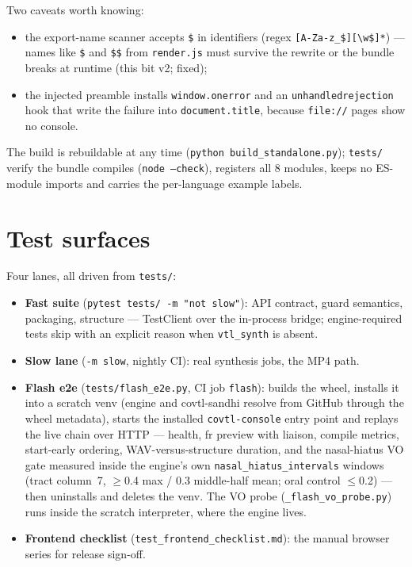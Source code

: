 \documentclass[11pt,a4paper]{article}
\begin{document}
Two caveats worth knowing:
\begin{itemize}
\item the export-name scanner accepts \texttt{\$} in identifiers
  (regex \texttt{[A-Za-z\_\$][\textbackslash w\$]*}) --- names like
  \texttt{\$} and \texttt{\$\$} from \texttt{render.js} must survive the
  rewrite or the bundle breaks at runtime (this bit v2; fixed);
\item the injected preamble installs \texttt{window.onerror} and an
  \texttt{unhandledrejection} hook that write the failure into
  \texttt{document.title}, because \texttt{file://} pages show no
  console.
\end{itemize}

The build is rebuildable at any time
(\texttt{python build\_standalone.py}); \texttt{tests/} verify the
bundle compiles (\texttt{node --check}), registers all 8 modules, keeps
no ES-module imports and carries the per-language example labels.

\section{Test surfaces}

Four lanes, all driven from \texttt{tests/}:
\begin{itemize}
\item \textbf{Fast suite} (\texttt{pytest tests/ -m "not slow"}): API
  contract, guard semantics, packaging, structure --- TestClient over
  the in-process bridge; engine-required tests skip with an explicit
  reason when \texttt{vtl\_synth} is absent.
\item \textbf{Slow lane} (\texttt{-m slow}, nightly CI): real synthesis
  jobs, the MP4 path.
\item \textbf{Flash e2e} (\texttt{tests/flash\_e2e.py}, CI job
  \texttt{flash}): builds the wheel, installs it into a scratch venv
  (engine and covtl-sandhi resolve from GitHub through the wheel
  metadata), starts the installed \texttt{covtl-console} entry point
  and replays the live chain over HTTP --- health, fr preview with
  liaison, compile metrics, start-early ordering, WAV-versus-structure
  duration, and the nasal-hiatus VO gate measured inside the engine's
  own \texttt{nasal\_hiatus\_intervals} windows (tract column~7,
  $\geq$0.4 max / 0.3 middle-half mean; oral control $\leq$0.2) ---
  then uninstalls and deletes the venv. The VO probe
  (\texttt{\_flash\_vo\_probe.py}) runs inside the scratch interpreter,
  where the engine lives.
\item \textbf{Frontend checklist} (\texttt{test\_frontend\_checklist.md}):
  the manual browser series for release sign-off.
\end{itemize}
\end{document}
